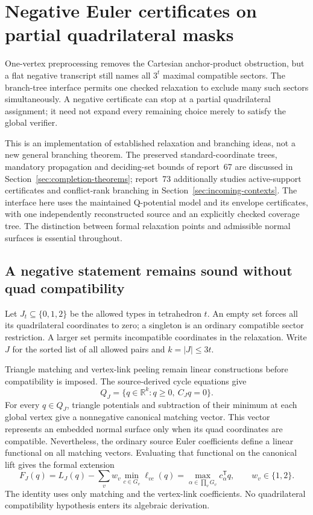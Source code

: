 \section{Negative Euler certificates on partial quadrilateral masks}
\label{sec:euler-branch-tree}

One-vertex preprocessing removes the Cartesian anchor-product obstruction,
but a flat negative transcript still names all $3^t$ maximal compatible
sectors.  The branch-tree interface permits one checked relaxation to
exclude many such sectors simultaneously.  A negative certificate can stop
at a partial quadrilateral assignment; it need not expand every remaining
choice merely to satisfy the global verifier.

This is an implementation of established relaxation and branching ideas,
not a new general branching theorem.  The preserved standard-coordinate
trees, mandatory propagation and deciding-set bounds of report~67 are
discussed in Section~\ref{sec:completion-theorems}; report~73 additionally
studies active-support certificates and conflict-rank branching in
Section~\ref{sec:incoming-contexts}.  The interface here
uses the maintained Q-potential model and its envelope certificates, with
one independently reconstructed source and an explicitly checked coverage
tree.  The distinction between formal relaxation points and admissible
normal surfaces is essential throughout.

\subsection{A negative statement remains sound without quad compatibility}

Let $J_t\subseteq\{0,1,2\}$ be the allowed types in tetrahedron $t$.
An empty set forces all its quadrilateral coordinates to zero; a singleton
is an ordinary compatible sector restriction.  A larger set permits
incompatible coordinates in the relaxation.  Write $J$ for the sorted list
of all allowed pairs and $k=|J|\le3t$.

Triangle matching and vertex-link peeling remain linear constructions
before compatibility is imposed.  The source-derived cycle equations give
\[
 Q_J=\{q\in\mathbb R^k:q\ge0,\ C_Jq=0\}.
\]
For every $q\in Q_J$, triangle potentials and subtraction of their minimum
at each global vertex give a nonnegative canonical matching vector.  This
vector represents an embedded normal surface only when its quad coordinates
are compatible.  Nevertheless, the ordinary source Euler coefficients
define a linear functional on all matching vectors.  Evaluating that
functional on the canonical lift gives the formal extension
\[
 F_J(q)=L_J(q)-\sum_v w_v\min_{c\in G_v}\ell_{vc}(q)
       =\max_{\alpha\in\prod_vG_v}c_\alpha^{\mathsf T}q,
 \qquad w_v\in\{1,2\}.
\]
The identity uses only matching and the vertex-link coefficients.  No
quadrilateral compatibility hypothesis enters its algebraic derivation.

